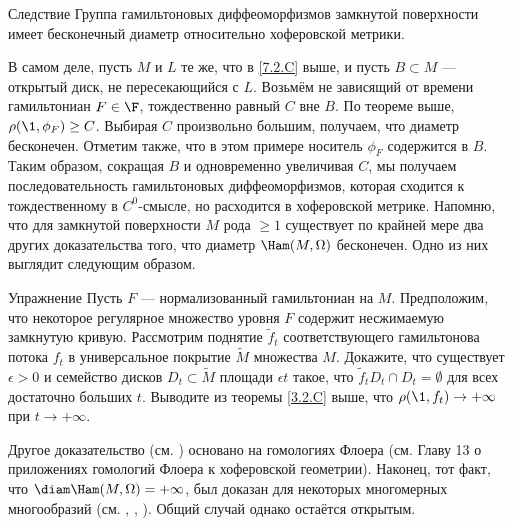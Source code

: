 \begin{thm}{Следствие}\label{7.2.D} Группа гамильтоновых диффеоморфизмов замкнутой поверхности имеет бесконечный диаметр относительно хоферовской метрики.
\end{thm}

В самом деле, пусть $M$ и $L$ те же, что в \ref{7.2.C} выше, и пусть $B \subset M$ --- открытый диск, не пересекающийся с $L$.
Возьмём не зависящий от времени гамильтониан $F \in \F$, тождественно равный $C$ вне $B$.
По теореме выше, $\rho (\1, \phi_F) \ge C$.
Выбирая $C$ произвольно большим, получаем, что диаметр бесконечен.
Отметим также, что в этом примере носитель $\phi_F$ содержится в $B$.
Таким образом, сокращая $B$ и одновременно увеличивая $C$, мы получаем последовательность гамильтоновых диффеоморфизмов, которая сходится к тождественному в $C^0$-смысле, но расходится в хоферовской метрике.
Напомню, что для замкнутой поверхности $M$ рода $\ge 1$ существует по крайней мере два других доказательства того, что диаметр $\Ham (M, \Omega)$ бесконечен.
Одно из них выглядит следующим образом.

\begin{thm}[см. \cite{LM2}.]{Упражнение} \label{7.2.E}
Пусть $F$ --- нормализованный гамильтониан на $M$.
Предположим, что некоторое регулярное множество уровня $F$ содержит несжимаемую замкнутую кривую.
Рассмотрим поднятие $\tilde f_t$ соответствующего гамильтонова потока $f_t$ в универсальное покрытие $\tilde M$ множества $M$.
Докажите, что существует $\epsilon> 0$ и семейство дисков $D_t \subset \tilde M$ площади $\epsilon t$ такое, что $\tilde f_t D_t \cap D_t = \emptyset$ для всех достаточно больших $t$.
Выводите из теоремы \ref{3.2.C} выше, что $\rho (\1, f_t) \to + \infty$ при $t \to + \infty$.
\end{thm}

Другое доказательство (см. \cite{Sch3}) основано на гомологиях Флоера (см. Главу 13 о приложениях гомологий Флоера к хоферовской геометрии).
Наконец, тот факт, что $\diam \Ham (M, \Omega) = + \infty$, был доказан для некоторых многомерных многообразий (см. \cite{LM2}, \cite{Sch3}, \cite{P5}).
Общий случай однако остаётся открытым.

